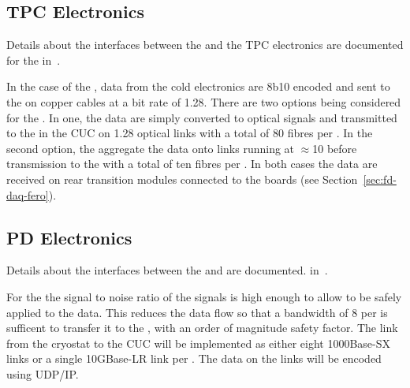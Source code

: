 
\subsection{TPC Electronics}
\label{sec:fd-daq-intfc-elec}

Details about the interfaces between the  and the TPC electronics
are documented for the  
in~\cite{docdb-6742}.

In the case of the  , data from the cold
electronics  are 8b10 encoded and sent to the
 on copper cables at a bit rate of \SI{1.28}{\Gbps}. There
are two options being considered for the . In one, the
data are simply converted to optical signals and transmitted to the
 in the CUC on \SI{1.28}{\Gbps} optical links with a total of 80
fibres per . In the second option, the  aggregate the
data onto links running at $\approx$\SI{10}{\Gbps} before transmission
to the  with a total of ten fibres per . In both cases the data
are received on rear transition modules connected to the 
 boards (see Section~\ref{sec:fd-daq-fero}).


\subsection{PD Electronics}
\label{sec:fd-daq-intfc-photon}

Details about the interfaces between the  and 
 are documented. in~\cite{docdb-6727}.


For the   the signal to noise ratio of the
 signals is high enough to allow  to be safely
applied to the data. This reduces the data flow so that a bandwidth of
\SI{8}{\Gbps} per  is sufficent to transfer it to the ,
with an order of magnitude safety factor. The link from the 
cryostat to the CUC will be implemented as either eight 1000Base-SX
links or a single 10GBase-LR link per .
The data on the links will be encoded using UDP/IP.
